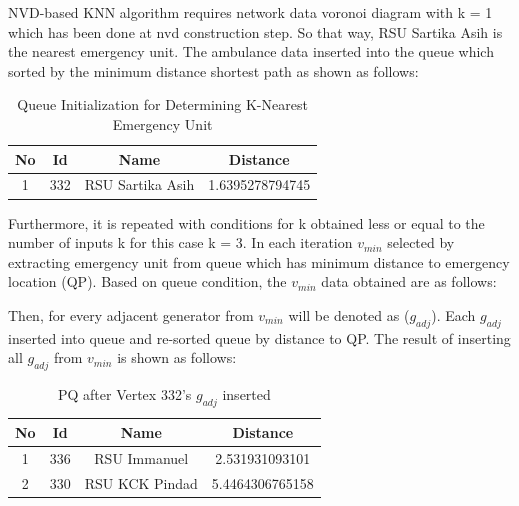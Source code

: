 \pagebreak
NVD-based KNN algorithm requires network data voronoi diagram with k = 1 which has been done at nvd construction step. So that way, RSU Sartika Asih is the nearest emergency unit. The ambulance data inserted into the queue which sorted by the minimum distance shortest path as shown as follows:

\begin{table}[H] 
\centering
\begin{tabular}{|c|c|c|c|}
\hline
\textbf{No} & \textbf{Id} & \textbf{Name} & \textbf{Distance} \\
\hline
1 &  332 & RSU Sartika Asih & 1.6395278794745\\
\hline
\end{tabular}
\caption{Queue Initialization for Determining K-Nearest Emergency Unit}
\label{table:pq_initialization_3}
\end{table}

Furthermore, it is repeated with conditions for k obtained less or equal to the number of inputs k for this case k = 3. In each iteration $ v_ {min} $ selected by extracting emergency unit from queue which has minimum distance to emergency location (QP). Based on queue condition, the $ v_ {min} $ data obtained are as follows:

\begin{table}[H]
\end{table}

Then, for every adjacent generator from $v_ {min}$ will be denoted as ($g_ {adj}$). Each $g_ {adj}$ inserted into queue and re-sorted queue by distance to QP. The result of inserting all $g_ {adj}$ from $v_ {min}$ is shown as follows:

\begin{table}[H] 
\centering
\begin{tabular}{|c|c|c|c|}
\hline
\textbf{No} & \textbf{Id} & \textbf{Name} & \textbf{Distance} \\
\hline
1 &  336 & RSU Immanuel & 2.531931093101\\
\hline
2 &  330 & RSU KCK Pindad & 5.4464306765158\\
\hline
\end{tabular}
\caption{PQ after Vertex 332's $g_{adj}$ inserted}
\label{table:tblhospital}
\end{table}

